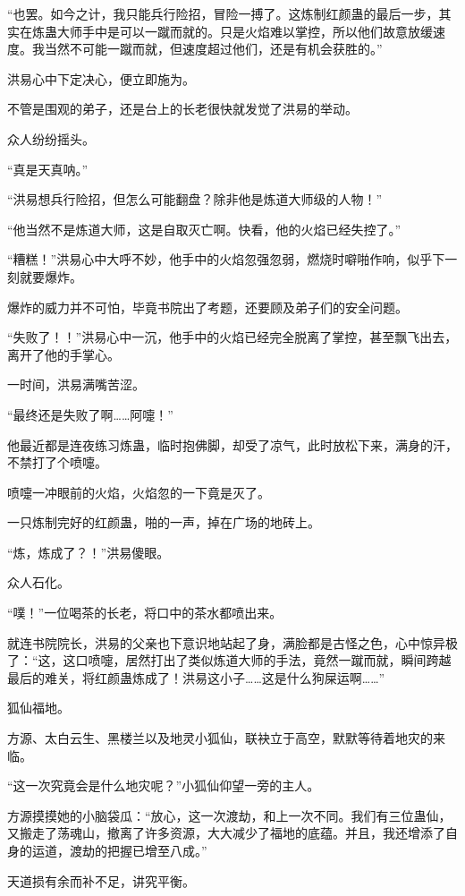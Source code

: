 \begin{this_body}
“也罢。如今之计，我只能兵行险招，冒险一搏了。这炼制红颜蛊的最后一步，其实在炼蛊大师手中是可以一蹴而就的。只是火焰难以掌控，所以他们故意放缓速度。我当然不可能一蹴而就，但速度超过他们，还是有机会获胜的。”

洪易心中下定决心，便立即施为。

不管是围观的弟子，还是台上的长老很快就发觉了洪易的举动。

众人纷纷摇头。

“真是天真呐。”

“洪易想兵行险招，但怎么可能翻盘？除非他是炼道大师级的人物！”

“他当然不是炼道大师，这是自取灭亡啊。快看，他的火焰已经失控了。”

“糟糕！”洪易心中大呼不妙，他手中的火焰忽强忽弱，燃烧时噼啪作响，似乎下一刻就要爆炸。

爆炸的威力并不可怕，毕竟书院出了考题，还要顾及弟子们的安全问题。

“失败了！！”洪易心中一沉，他手中的火焰已经完全脱离了掌控，甚至飘飞出去，离开了他的手掌心。

一时间，洪易满嘴苦涩。

“最终还是失败了啊……阿嚏！”

他最近都是连夜练习炼蛊，临时抱佛脚，却受了凉气，此时放松下来，满身的汗，不禁打了个喷嚏。

喷嚏一冲眼前的火焰，火焰忽的一下竟是灭了。

一只炼制完好的红颜蛊，啪的一声，掉在广场的地砖上。

“炼，炼成了？！”洪易傻眼。

众人石化。

“噗！”一位喝茶的长老，将口中的茶水都喷出来。

就连书院院长，洪易的父亲也下意识地站起了身，满脸都是古怪之色，心中惊异极了：“这，这口喷嚏，居然打出了类似炼道大师的手法，竟然一蹴而就，瞬间跨越最后的难关，将红颜蛊炼成了！洪易这小子……这是什么狗屎运啊……”

狐仙福地。

方源、太白云生、黑楼兰以及地灵小狐仙，联袂立于高空，默默等待着地灾的来临。

“这一次究竟会是什么地灾呢？”小狐仙仰望一旁的主人。

方源摸摸她的小脑袋瓜：“放心，这一次渡劫，和上一次不同。我们有三位蛊仙，又搬走了荡魂山，撤离了许多资源，大大减少了福地的底蕴。并且，我还增添了自身的运道，渡劫的把握已增至八成。”

天道损有余而补不足，讲究平衡。


\end{this_body}
